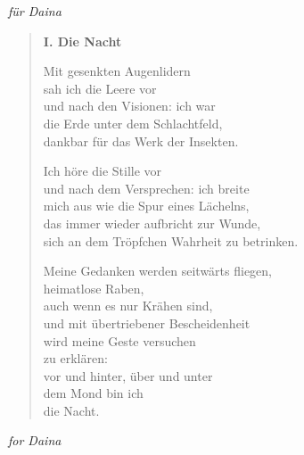 
\cleartoverso

\label{yucatan}

\hspace*{2em}\emph{für Daina}

\begin{verse}

{\bfseries I. Die Nacht}

Mit gesenkten Augenlidern\\
sah ich die Leere vor\\
und nach den Visionen: ich war\\
die Erde unter dem Schlachtfeld,\\
dankbar für das Werk der Insekten.

Ich höre die Stille vor\\
und nach dem Versprechen: ich breite\\
mich aus wie die Spur eines Lächelns,\\
das immer wieder aufbricht zur Wunde,\\
sich an dem Tröpfchen Wahrheit zu betrinken.

Meine Gedanken werden seitwärts fliegen,\\
heimatlose Raben,\\
auch wenn es nur Krähen sind,\\
und mit übertriebener Bescheidenheit\\
wird meine Geste versuchen\\
zu erklären:\\
vor und hinter, über und unter\\
dem Mond bin ich\\
die Nacht.
\end{verse}

\clearpage


\hspace*{2em}\emph{for Daina}

